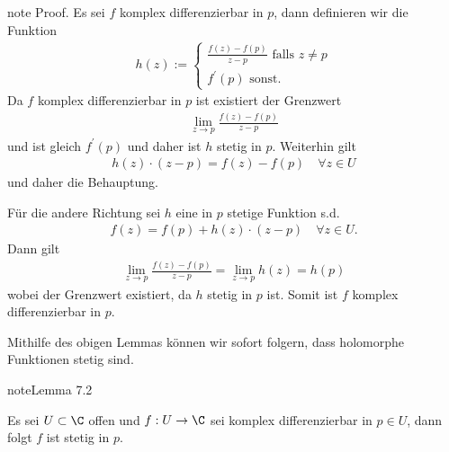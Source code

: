 \documentclass[letterpaper,10pt,german]{jupyterBook}
\begin{document}
\begin{sphinxadmonition}{note}
\sphinxAtStartPar
Proof. Es sei \(f\) komplex differenzierbar in \(p\), dann definieren wir die Funktion
\begin{equation*}
\begin{split}h(z):=
\begin{cases}
\frac{f(z) - f(p)}{z-p}\text{ falls }z\neq p\\
f^\prime(p)\text{ sonst.}
\end{cases}\end{split}
\end{equation*}
\sphinxAtStartPar
Da \(f\) komplex differenzierbar in \(p\) ist existiert der Grenzwert
\begin{equation*}
\begin{split}\lim_{z\to p} \frac{f(z) - f(p)}{z-p}\end{split}
\end{equation*}
\sphinxAtStartPar
und ist gleich \(f^\prime(p)\) und daher ist \(h\) stetig in \(p\). Weiterhin gilt
\begin{equation*}
\begin{split}h(z)\cdot (z-p) = f(z) - f(p)\quad\forall z\in U\end{split}
\end{equation*}
\sphinxAtStartPar
und daher die Behauptung.

\sphinxAtStartPar
Für die andere Richtung sei \(h\) eine in \(p\) stetige Funktion s.d.
\begin{equation*}
\begin{split}f(z) = f(p) + h(z)\cdot (z-p)\quad\forall z\in U.\end{split}
\end{equation*}
\sphinxAtStartPar
Dann gilt
\begin{equation*}
\begin{split}\lim_{z\to p} \frac{f(z) - f(p)}{z-p} = \lim_{z\to p} h(z) = h(p)\end{split}
\end{equation*}
\sphinxAtStartPar
wobei der Grenzwert existiert, da \(h\) stetig in \(p\) ist. Somit ist \(f\) komplex differenzierbar in \(p\).
\end{sphinxadmonition}

\sphinxAtStartPar
Mithilfe des obigen Lemmas können wir sofort folgern, dass holomorphe Funktionen stetig sind.
\label{complexanalysis/cauchyriemann:lemma-3}
\begin{sphinxadmonition}{note}{Lemma 7.2}



\sphinxAtStartPar
Es sei \(U\subset\C\) offen und \(f:U\to\C\) sei komplex differenzierbar in \(p\in U\), dann folgt \(f\) ist stetig in \(p\).
\end{sphinxadmonition}
\end{document}
